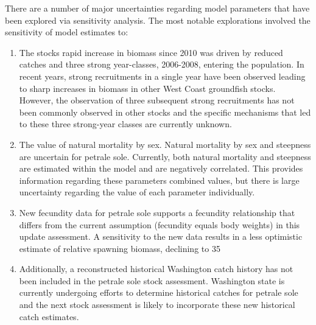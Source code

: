 \documentclass[12pt,]{article}
\begin{document}
There are a number of major uncertainties regarding model parameters
that have been explored via sensitivity analysis. The most notable
explorations involved the sensitivity of model estimates to:

\begin{enumerate}

\item The stocks rapid increase in biomass since 2010 was driven by reduced catches and three strong year-classes, 2006-2008, entering the population.  In recent years, strong recruitments in a single year have been observed leading to sharp increases in biomass in other West Coast groundfish stocks. However, the observation of three subsequent strong recruitments has not been commonly observed in other stocks and the specific mechanisms that led to these three strong-year classes are currently unknown. 

\item The value of natural mortality by sex.    Natural mortality by sex and steepness are uncertain for petrale sole.  Currently, both natural mortality and steepness are estimated within the model and are negatively correlated.  This provides information regarding these parameters combined values, but there is large uncertainty regarding the value of each parameter individually.

\item New fecundity data for petrale sole supports a fecundity relationship that differs from the current assumption (fecundity equals body weights) in this update assessment. A sensitivity to the new data results in a less optimistic estimate of relative spawning biomass, declining to 35%

\item Additionally, a reconstructed historical Washington catch history has not been included in the petrale sole stock assessment.  Washington state is currently undergoing efforts to determine historical catches for petrale sole and the next stock assessment is likely to incorporate these new historical catch estimates. 

\end{enumerate}
\end{document}
